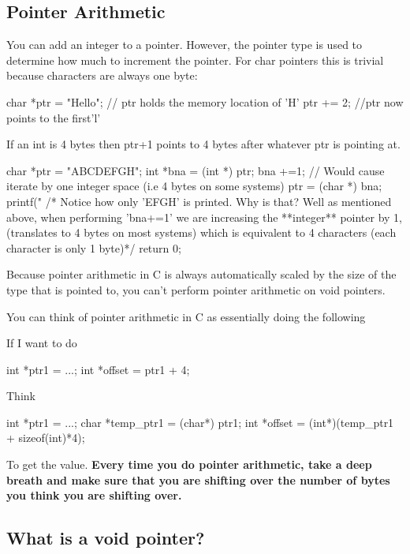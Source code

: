 \subsection{Pointer Arithmetic}

You can add an integer to a pointer. However, the pointer type is used
to determine how much to increment the pointer. For char pointers this
is trivial because characters are always one byte:

\begin{code}[language=C]
char *ptr = "Hello"; // ptr holds the memory location of 'H'
ptr += 2; //ptr now points to the first'l'
\end{code}

If an int is 4 bytes then ptr+1 points to 4 bytes after whatever ptr is
pointing at.

\begin{code}[language=C]
char *ptr = "ABCDEFGH";
int *bna = (int *) ptr;
bna +=1; // Would cause iterate by one integer space (i.e 4 bytes on some systems)
ptr = (char *) bna;
printf("%
/* Notice how only 'EFGH' is printed. Why is that? Well as mentioned above, when performing 'bna+=1' we are increasing the **integer** pointer by 1, (translates to 4 bytes on most systems) which is equivalent to 4 characters (each character is only 1 byte)*/
return 0;
\end{code}

Because pointer arithmetic in C is always automatically scaled by the
size of the type that is pointed to, you can't perform pointer
arithmetic on void pointers.

You can think of pointer arithmetic in C as essentially doing the
following

If I want to do

\begin{code}[language=C]
int *ptr1 = ...;
int *offset = ptr1 + 4;
\end{code}

Think

\begin{code}[language=C]
int *ptr1 = ...;
char *temp_ptr1 = (char*) ptr1;
int *offset = (int*)(temp_ptr1 + sizeof(int)*4);
\end{code}

To get the value. \textbf{Every time you do pointer arithmetic, take a
deep breath and make sure that you are shifting over the number of bytes
you think you are shifting over.}

\subsection{What is a void pointer?}

